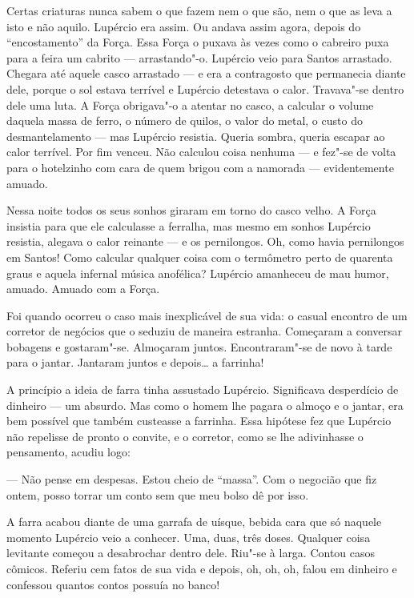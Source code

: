 Certas criaturas nunca sabem o que fazem nem o que são, nem o que as
leva a isto e não aquilo. Lupércio era assim. Ou andava assim agora,
depois do ``encostamento'' da Força. Essa Força o puxava às vezes como o
cabreiro puxa para a feira um cabrito --- arrastando"-o. Lupércio veio
para Santos arrastado. Chegara até aquele casco arrastado --- e era a
contragosto que permanecia diante dele, porque o sol estava terrível e
Lupércio detestava o calor. Travava"-se dentro dele uma luta. A Força
obrigava"-o a atentar no casco, a calcular o volume daquela massa de
ferro, o número de quilos, o valor do metal, o custo do desmantelamento
--- mas Lupércio resistia. Queria sombra, queria escapar ao calor
terrível. Por fim venceu. Não calculou coisa nenhuma --- e fez"-se de
volta para o hotelzinho com cara de quem brigou com a namorada ---
evidentemente amuado.

Nessa noite todos os seus sonhos giraram em torno do casco velho. A
Força insistia para que ele calculasse a ferralha, mas mesmo em sonhos
Lupércio resistia, alegava o calor reinante --- e os pernilongos. Oh,
como havia pernilongos em Santos! Como calcular qualquer coisa com o
termômetro perto de quarenta graus e aquela infernal música anofélica?
Lupércio amanheceu de mau humor, amuado. Amuado com a Força.

Foi quando ocorreu o caso mais inexplicável de sua vida: o casual
encontro de um corretor de negócios que o seduziu de maneira estranha.
Começaram a conversar bobagens e gostaram"-se. Almoçaram juntos.
Encontraram"-se de novo à tarde para o jantar. Jantaram juntos e
depois\ldots{} a farrinha!

A princípio a ideia de farra tinha assustado Lupércio. Significava
desperdício de dinheiro --- um absurdo. Mas como o homem lhe pagara o
almoço e o jantar, era bem possível que também custeasse a farrinha.
Essa hipótese fez que Lupércio não repelisse de pronto o convite, e o
corretor, como se lhe adivinhasse o pensamento, acudiu logo:

--- Não pense em despesas. Estou cheio de ``massa''. Com o negocião que
fiz ontem, posso torrar um conto sem que meu bolso dê por isso.

A farra acabou diante de uma garrafa de uísque, bebida cara que só
naquele momento Lupércio veio a conhecer. Uma, duas, três doses.
Qualquer coisa levitante começou a desabrochar dentro dele. Riu"-se à
larga. Contou casos cômicos. Referiu cem fatos de sua vida e depois, oh,
oh, oh, falou em dinheiro e confessou quantos contos possuía no banco!

